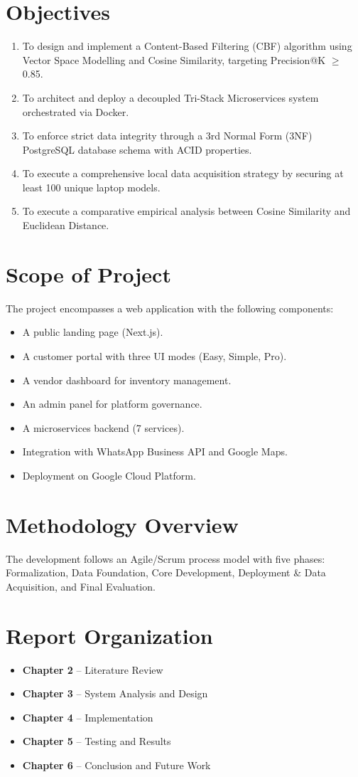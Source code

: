 \section{Objectives}
\begin{enumerate}
  \item To design and implement a Content-Based Filtering (CBF) algorithm using
    Vector Space Modelling and Cosine Similarity, targeting Precision@K $\geq$ 0.85.
  \item To architect and deploy a decoupled Tri-Stack Microservices system
    orchestrated via Docker.
  \item To enforce strict data integrity through a 3rd Normal Form (3NF)
    PostgreSQL database schema with ACID properties.
  \item To execute a comprehensive local data acquisition strategy by securing
    at least 100 unique laptop models.
  \item To execute a comparative empirical analysis between Cosine Similarity
    and Euclidean Distance.
\end{enumerate}

\section{Scope of Project}
The project encompasses a web application with the following components:
\begin{itemize}
  \item A public landing page (Next.js).
  \item A customer portal with three UI modes (Easy, Simple, Pro).
  \item A vendor dashboard for inventory management.
  \item An admin panel for platform governance.
  \item A microservices backend (7 services).
  \item Integration with WhatsApp Business API and Google Maps.
  \item Deployment on Google Cloud Platform.
\end{itemize}

\section{Methodology Overview}
The development follows an Agile/Scrum process model with five phases:
Formalization, Data Foundation, Core Development, Deployment \& Data Acquisition,
and Final Evaluation.

\section{Report Organization}
\begin{itemize}
  \item \textbf{Chapter 2} -- Literature Review
  \item \textbf{Chapter 3} -- System Analysis and Design
  \item \textbf{Chapter 4} -- Implementation
  \item \textbf{Chapter 5} -- Testing and Results
  \item \textbf{Chapter 6} -- Conclusion and Future Work
\end{itemize}
